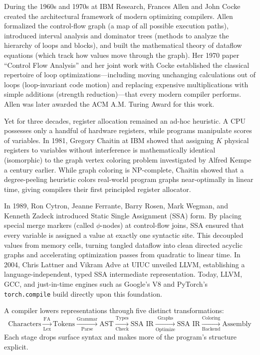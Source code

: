 \begin{historybox}
During the 1960s and 1970s at IBM Research, Frances Allen and John Cocke created
the architectural framework of modern optimizing compilers. Allen formalized the
control-flow graph (a map of all possible execution paths), introduced interval analysis and dominator trees (methods to analyze the hierarchy of loops and blocks), and built
the mathematical theory of dataflow equations (which track how values move through the graph). Her 1970 paper ``Control Flow
Analysis'' and her joint work with Cocke established the classical repertoire of
loop optimizations---including moving unchanging calculations out of loops (loop-invariant code motion) and replacing expensive multiplications with simple additions (strength reduction)---that every modern compiler performs. Allen was later
awarded the ACM A.M. Turing Award for this work.

Yet for three decades, register allocation remained an ad-hoc heuristic. A CPU
possesses only a handful of hardware registers, while programs manipulate scores
of variables. In 1981, Gregory Chaitin at IBM showed
that assigning $K$ physical registers to variables without interference is
mathematically identical (isomorphic) to the graph vertex coloring problem investigated by
Alfred Kempe a century earlier. While graph coloring is NP-complete, Chaitin
showed that a degree-peeling heuristic colors real-world program graphs near-optimally
in linear time, giving compilers their first principled register allocator.

In 1989, Ron Cytron, Jeanne Ferrante, Barry Rosen, Mark Wegman, and Kenneth
Zadeck introduced Static Single Assignment (SSA) form. By placing special merge markers (called $\phi$-nodes) at
control-flow joins, SSA ensured that every variable is assigned a value at exactly one
syntactic site. This decoupled values from memory cells, turning tangled dataflow
into clean directed acyclic graphs and accelerating optimization passes from
quadratic to linear time. In 2004, Chris Lattner and Vikram Adve at UIUC unveiled
LLVM, establishing a language-independent, typed SSA intermediate representation.
Today, LLVM, GCC, and just-in-time engines such as Google's V8 and PyTorch's
\texttt{torch.compile} build directly upon this foundation.
\end{historybox}

\begin{focusbox}
A compiler lowers representations through five distinct transformations:
\[
  \text{Characters} \xrightarrow[\text{Lex}]{\text{FA}}
  \text{Tokens} \xrightarrow[\text{Parse}]{\text{Grammar}}
  \text{AST} \xrightarrow[\text{Check}]{\text{Types}}
  \text{SSA IR} \xrightarrow[\text{Optimize}]{\text{Graphs}}
  \text{SSA IR} \xrightarrow[\text{Backend}]{\text{Coloring}}
  \text{Assembly}
\]
Each stage drops surface syntax and makes more of the program's structure explicit.
\end{focusbox}

